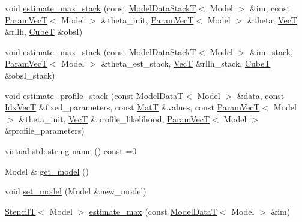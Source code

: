 \begin{DoxyCompactItemize}
void \hyperlink{classmappel_1_1ThreadedEstimator_afb7a2e27b4e8dcc2fa604f83344461fe}{estimate\+\_\+max\+\_\+stack} (const \hyperlink{namespacemappel_aaeb6665bc57476dd93c2df6ad8bc4768}{Model\+Data\+StackT}$<$ Model $>$ \&im, const \hyperlink{namespacemappel_a0f86d3153e4e27b095012f140eea58de}{Param\+VecT}$<$ Model $>$ \&theta\+\_\+init, \hyperlink{namespacemappel_a0f86d3153e4e27b095012f140eea58de}{Param\+VecT}$<$ Model $>$ \&theta, \hyperlink{namespacemappel_a2225ad69f358daa3f4f99282a35b9a3a}{VecT} \&rllh, \hyperlink{namespacemappel_ab2afab4e6c8805e83946670d882768c2}{CubeT} \&obsI)
\item 
void \hyperlink{classmappel_1_1Estimator_aa1b1c2677df2c6ea9fcf67b6a0856e46}{estimate\+\_\+max\+\_\+stack} (const \hyperlink{namespacemappel_aaeb6665bc57476dd93c2df6ad8bc4768}{Model\+Data\+StackT}$<$ Model $>$ \&im\+\_\+stack, \hyperlink{namespacemappel_a0f86d3153e4e27b095012f140eea58de}{Param\+VecT}$<$ Model $>$ \&theta\+\_\+est\+\_\+stack, \hyperlink{namespacemappel_a2225ad69f358daa3f4f99282a35b9a3a}{VecT} \&rllh\+\_\+stack, \hyperlink{namespacemappel_ab2afab4e6c8805e83946670d882768c2}{CubeT} \&obs\+I\+\_\+stack)
\item 
void \hyperlink{classmappel_1_1ThreadedEstimator_aebbf686f95be1331ff85cecd5a3c97db}{estimate\+\_\+profile\+\_\+stack} (const \hyperlink{namespacemappel_a97f050df953605381ae9c901c3b125f1}{Model\+DataT}$<$ Model $>$ \&data, const \hyperlink{namespacemappel_ac63743dcd42180127307cd0e4ecdd784}{Idx\+VecT} \&fixed\+\_\+parameters, const \hyperlink{namespacemappel_a7091ab87c528041f7e2027195fad8915}{MatT} \&values, const \hyperlink{namespacemappel_a0f86d3153e4e27b095012f140eea58de}{Param\+VecT}$<$ Model $>$ \&theta\+\_\+init, \hyperlink{namespacemappel_a2225ad69f358daa3f4f99282a35b9a3a}{VecT} \&profile\+\_\+likelihood, \hyperlink{namespacemappel_a0f86d3153e4e27b095012f140eea58de}{Param\+VecT}$<$ Model $>$ \&profile\+\_\+parameters)
\item 
virtual std\+::string \hyperlink{classmappel_1_1Estimator_a403f11575f81e47095e57cc403fd760d}{name} () const =0
\item 
Model \& \hyperlink{classmappel_1_1Estimator_a6c0b757d89033d70bdf03ad1fe6b03da}{get\+\_\+model} ()
\item 
void \hyperlink{classmappel_1_1Estimator_aacade4f66038545ad196edf7e8596187}{set\+\_\+model} (Model \&new\+\_\+model)
\item 
\hyperlink{namespacemappel_a3a06598240007876f8c4bf834ad86197}{StencilT}$<$ Model $>$ \hyperlink{classmappel_1_1Estimator_a4406c994d5b6239e75628ea5d479bfa2}{estimate\+\_\+max} (const \hyperlink{namespacemappel_a97f050df953605381ae9c901c3b125f1}{Model\+DataT}$<$ Model $>$ \&im)

\end{DoxyCompactItemize}
